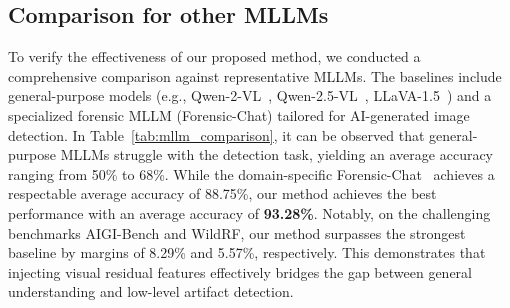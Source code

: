 \documentclass{article}
\theoremstyle{plain}
\theoremstyle{definition}
\theoremstyle{remark}
\begin{document}
\subsection{Comparison for other MLLMs}
To verify the effectiveness of our proposed method, we conducted a comprehensive comparison against representative MLLMs. 
The baselines include general-purpose models (e.g., Qwen-2-VL~\cite{wang2024qwen2}, Qwen-2.5-VL~\cite{qwen25}, LLaVA-1.5~\cite{liu2023visual}) and a specialized forensic MLLM (Forensic-Chat) tailored for AI-generated image detection.
In Table~\ref{tab:mllm_comparison}, it can be observed that general-purpose MLLMs struggle with the detection task, yielding an average accuracy ranging from 50\% to 68\%. 
While the domain-specific Forensic-Chat~\cite{lin2025seeing} achieves a respectable average accuracy of 88.75\%, our method achieves the best performance with an average accuracy of \textbf{93.28\%}. 
Notably, on the challenging benchmarks AIGI-Bench and WildRF, our method surpasses the strongest baseline by margins of 8.29\% and 5.57\%, respectively. 
This demonstrates that injecting visual residual features effectively bridges the gap between general understanding and low-level artifact detection.

\begin{table}[h]
  \scriptsize
  \centering
  \caption{Comparison of performance (ACC\%) across different MLLMs on AIGI detection benchmarks. Forensic-Chat is an MLLM-based detector tailored for AIGI detection.}
  \label{tab:mllm_comparison}
\end{table}
\end{document}
